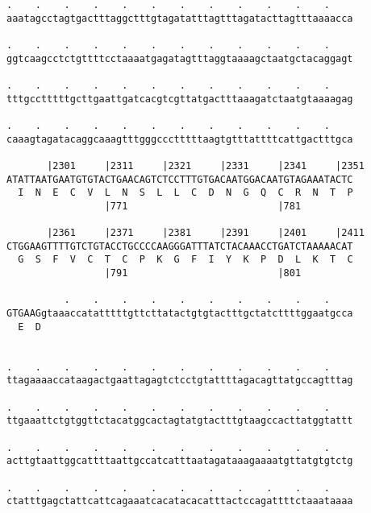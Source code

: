 \documentclass{article}
\begin{document}
\begin{Verbatim}
.    .    .    .    .    .    .    .    .    .    .    .    
aaatagcctagtgactttaggctttgtagatatttagtttagatacttagtttaaaacca
                                                            
.    .    .    .    .    .    .    .    .    .    .    .    
ggtcaagcctctgttttcctaaaatgagatagtttaggtaaaagctaatgctacaggagt
                                                            
.    .    .    .    .    .    .    .    .    .    .    .    
tttgcctttttgcttgaattgatcacgtcgttatgactttaaagatctaatgtaaaagag
                                                            
.    .    .    .    .    .    .    .    .    .    .    .    
caaagtagatacaggcaaagtttgggccctttttaagtgtttattttcattgactttgca
                                                            
       |2301     |2311     |2321     |2331     |2341     |2351
ATATTAATGAATGTGTACTGAACAGTCTCCTTTGTGACAATGGACAATGTAGAAATACTC
  I  N  E  C  V  L  N  S  L  L  C  D  N  G  Q  C  R  N  T  P
                 |771                          |781         
  
       |2361     |2371     |2381     |2391     |2401     |2411
CTGGAAGTTTTGTCTGTACCTGCCCCAAGGGATTTATCTACAAACCTGATCTAAAAACAT
  G  S  F  V  C  T  C  P  K  G  F  I  Y  K  P  D  L  K  T  C
                 |791                          |801         
  
          .    .    .    .    .    .    .    .    .    .    
GTGAAGgtaaaccatatttttgttcttatactgtgtactttgctatcttttggaatgcca
  E  D                                                      
                                                            
  
.    .    .    .    .    .    .    .    .    .    .    .    
ttagaaaaccataagactgaattagagtctcctgtattttagacagttatgccagtttag
                                                            
.    .    .    .    .    .    .    .    .    .    .    .    
ttgaaattctgtggttctacatggcactagtatgtactttgtaagccacttatggtattt
                                                            
.    .    .    .    .    .    .    .    .    .    .    .    
acttgtaattggcattttaattgccatcatttaatagataaagaaaatgttatgtgtctg
                                                            
.    .    .    .    .    .    .    .    .    .    .    .    
ctatttgagctattcattcagaaatcacatacacatttactccagattttctaaataaaa
                                                            

\end{Verbatim}
\end{document}
